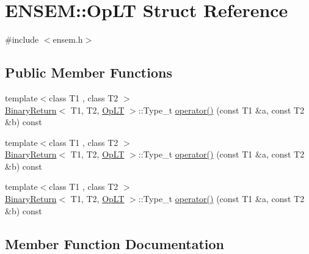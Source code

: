 \hypertarget{structENSEM_1_1OpLT}{}\section{E\+N\+S\+EM\+:\+:Op\+LT Struct Reference}
\label{structENSEM_1_1OpLT}


{\ttfamily \#include $<$ensem.\+h$>$}

\subsection*{Public Member Functions}
\begin{DoxyCompactItemize}
\item 
{\footnotesize template$<$class T1 , class T2 $>$ }\\\mbox{\hyperlink{structENSEM_1_1BinaryReturn}{Binary\+Return}}$<$ T1, T2, \mbox{\hyperlink{structENSEM_1_1OpLT}{Op\+LT}} $>$\+::Type\+\_\+t \mbox{\hyperlink{structENSEM_1_1OpLT_af52d16f9a101e3c95c415857a2da4425}{operator()}} (const T1 \&a, const T2 \&b) const
\item 
{\footnotesize template$<$class T1 , class T2 $>$ }\\\mbox{\hyperlink{structENSEM_1_1BinaryReturn}{Binary\+Return}}$<$ T1, T2, \mbox{\hyperlink{structENSEM_1_1OpLT}{Op\+LT}} $>$\+::Type\+\_\+t \mbox{\hyperlink{structENSEM_1_1OpLT_af52d16f9a101e3c95c415857a2da4425}{operator()}} (const T1 \&a, const T2 \&b) const
\item 
{\footnotesize template$<$class T1 , class T2 $>$ }\\\mbox{\hyperlink{structENSEM_1_1BinaryReturn}{Binary\+Return}}$<$ T1, T2, \mbox{\hyperlink{structENSEM_1_1OpLT}{Op\+LT}} $>$\+::Type\+\_\+t \mbox{\hyperlink{structENSEM_1_1OpLT_af52d16f9a101e3c95c415857a2da4425}{operator()}} (const T1 \&a, const T2 \&b) const
\end{DoxyCompactItemize}


\subsection{Member Function Documentation}
\mbox{\label{structENSEM_1_1OpLT_af52d16f9a101e3c95c415857a2da4425}} 
